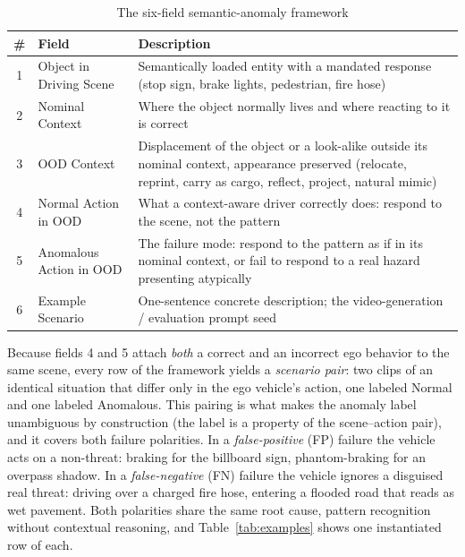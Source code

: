 \documentclass[conference]{IEEEtran}
\begin{document}
\begin{table}[htbp]
\caption{The six-field semantic-anomaly framework}
\begin{center}
\small
\begin{tabular}{|c|l|p{4.6cm}|}
\hline
\textbf{\#} & \textbf{Field} & \textbf{Description} \\
\hline
1 & Object in Driving Scene & Semantically loaded entity with a mandated response (stop sign, brake lights, pedestrian, fire hose) \\
\hline
2 & Nominal Context & Where the object normally lives and where reacting to it is correct \\
\hline
3 & OOD Context & Displacement of the object or a look-alike outside its nominal context, appearance preserved (relocate, reprint, carry as cargo, reflect, project, natural mimic) \\
\hline
4 & Normal Action in OOD & What a context-aware driver correctly does: respond to the scene, not the pattern \\
\hline
5 & Anomalous Action in OOD & The failure mode: respond to the pattern as if in its nominal context, or fail to respond to a real hazard presenting atypically \\
\hline
6 & Example Scenario & One-sentence concrete description; the video-generation / evaluation prompt seed \\
\hline
\end{tabular}
\label{tab:framework}
\end{center}
\end{table}

Because fields 4 and 5 attach \emph{both} a correct and an incorrect ego behavior to the same scene, every row of the framework yields a \emph{scenario pair}: two clips of an identical situation that differ only in the ego vehicle's action, one labeled Normal and one labeled Anomalous. This pairing is what makes the anomaly label unambiguous by construction (the label is a property of the scene--action pair), and it covers both failure polarities. In a \emph{false-positive} (FP) failure the vehicle acts on a non-threat: braking for the billboard sign, phantom-braking for an overpass shadow. In a \emph{false-negative} (FN) failure the vehicle ignores a disguised real threat: driving over a charged fire hose, entering a flooded road that reads as wet pavement. Both polarities share the same root cause, pattern recognition without contextual reasoning, and Table~\ref{tab:examples} shows one instantiated row of each.
\end{document}
